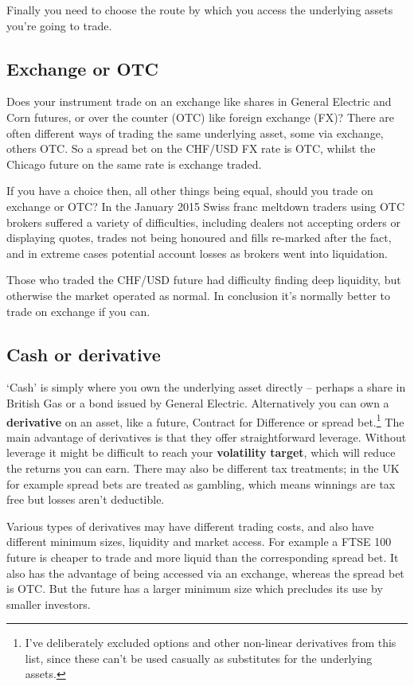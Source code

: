 Finally you need to choose the route by which you access the underlying assets you're going to trade.

\subsection*{Exchange or OTC}

Does your instrument trade on an exchange like shares in General Electric and Corn futures, or over the counter (OTC) like foreign exchange (FX)? There are often different ways of trading the same underlying asset, some via exchange, others OTC. So a spread bet on the CHF/USD FX rate is OTC, whilst the Chicago future on the same rate is exchange traded.

If you have a choice then, all other things being equal, should you trade on exchange or OTC? In the January 2015 Swiss franc meltdown traders using OTC brokers suffered a variety of difficulties, including dealers not accepting orders or displaying quotes, trades not being honoured and fills re-marked after the fact, and in extreme cases potential account losses as brokers went into liquidation.

Those who traded the CHF/USD future had difficulty finding deep liquidity, but otherwise the market operated as normal. In conclusion it's normally better to trade on exchange if you can.

\subsection*{Cash or derivative}

‘Cash' is simply where you own the underlying asset directly -- perhaps a share in British Gas or a bond issued by General Electric. Alternatively you can own a \textbf{derivative} on an asset, like a future, Contract for Difference or spread bet.\footnote{I've deliberately excluded options and other non-linear derivatives from this list, since these can't be used casually as substitutes for the underlying assets.} The main advantage of derivatives is that they offer straightforward leverage. Without leverage it might be difficult to reach your \textbf{volatility} \textbf{target}, which will reduce the returns you can earn. There may also be different tax treatments; in the UK for example spread bets are treated as gambling, which means winnings are tax free but losses aren't deductible.

Various types of derivatives may have different trading costs, and also have different minimum sizes, liquidity and market access. For example a FTSE 100 future is cheaper to trade and more liquid than the corresponding spread bet. It also has the advantage of being accessed via an exchange, whereas the spread bet is OTC. But the future has a larger minimum size which precludes its use by smaller investors.

